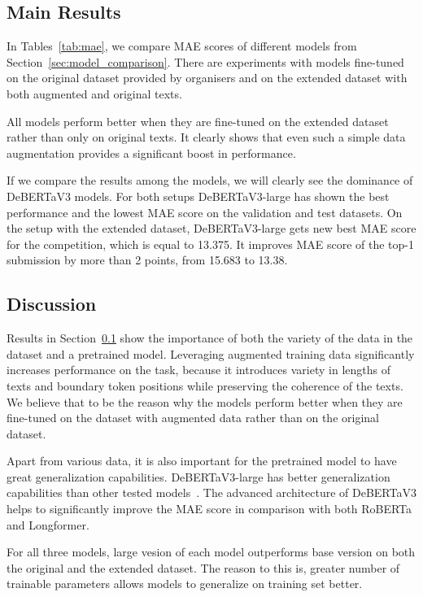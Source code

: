 \documentclass[11pt]{article}
\begin{document}
\subsection{Main Results}
\label{sec:results}

In Tables~\ref{tab:mae}, we compare MAE scores of different models from Section~\ref{sec:model_comparison}. There are experiments with models fine-tuned on the original dataset provided by organisers and on the  extended dataset with both augmented and original texts.

All models perform better when they are fine-tuned on the extended dataset rather than only on original texts. It clearly shows that even such a simple data augmentation provides a significant boost in performance.

If we compare the results among the models, we will clearly see the dominance of DeBERTaV3 models.
For both setups DeBERTaV3-large has shown the best performance and the lowest MAE score on the validation and test datasets. On the setup with the extended dataset, DeBERTaV3-large gets new best MAE score for the competition, which is equal to 13.375. It improves MAE score of the top-1 submission by more than 2 points, from 15.683 to 13.38.
\subsection{Discussion}
Results in Section~\ref{sec:results} show the importance of both the variety of the data in the dataset and a pretrained model. Leveraging  augmented training data significantly increases performance on the task, because it introduces variety in lengths of texts and boundary token positions while preserving the coherence of the texts. We believe that to be the reason why the models perform better when they are fine-tuned on the dataset with augmented data rather than on the original dataset.

Apart from various data, it is also important for the pretrained model to have great generalization capabilities. DeBERTaV3-large has better generalization capabilities than other tested models~\cite{he2021deberta}. The advanced architecture of DeBERTaV3 helps to significantly improve the MAE score in comparison with both RoBERTa and Longformer.

For all three models, large vesion of each model outperforms base version on both the original and the extended dataset. The reason to this is, greater number of trainable parameters allows models to generalize on training set better.
\end{document}
